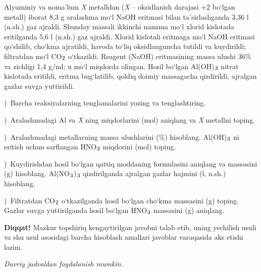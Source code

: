 \documentclass[11pt,a4paper]{article}
\renewcommand{\textsubscript}[1]{\ensuremath{_{\text{\fontsize{8}{8}\selectfont #1}}}}
\newcommand{\qsep}{\par\vspace{13pt}}
\newcommand{\diqqat}[1]{\par\smallskip\noindent\textbf{Diqqat!} #1\par\medskip}
\newcommand{\hdrpill}[1]{\begin{tikzpicture}[baseline=0pt]\node[fill=ygreen,text=white,rounded corners=8pt,inner xsep=10pt,inner ysep=5pt,font=\fontsize{13}{15}\bfseries\selectfont] at (0,0.475){#1};\end{tikzpicture}}
\newcommand{\curvar}{}\fancyhead[R]{\hdrpill{\curvar}}
\begin{document}
Alyuminiy va noma'lum \textit{X} metalldan (\textit{X} -- oksidlanish darajasi +2 bo`lgan metall) iborat 8,3 g aralashma mo`l NaOH eritmasi bilan ta'sirlashganda 3,36 l (n.sh.) gaz ajraldi. Shunday massali ikkinchi namuna mo`l xlorid kislotada eritilganda 5,6 l (n.sh.) gaz ajraldi. Xlorid kislotali eritmaga mo`l NaOH eritmasi qo`shilib, cho`kma ajratildi, havoda to`liq oksidlanguncha tutildi va kuydirildi; filtratdan mo`l CO\textsubscript{2} o`tkazildi. Reagent (NaOH) eritmasining massa ulushi 36\% va zichligi 1,4 g/ml; u mo`l miqdorda olingan. Hosil bo`lgan Al(OH)\textsubscript{3} nitrat kislotada eritildi, eritma bug`latilib, qoldiq doimiy massagacha qizdirildi, ajralgan gazlar suvga yuttirildi.\par
{})\ Barcha reaksiyalarning tenglamalarini yozing va tenglashtiring.\par
{})\ Aralashmadagi Al va \textit{X} ning miqdorlarini (mol) aniqlang va \textit{X} metallni toping.\par
{})\ Aralashmadagi metallarning massa ulushlarini (\%) hisoblang. Al(OH)\textsubscript{3} ni eritish uchun sarflangan HNO\textsubscript{3} miqdorini (mol) toping.\par
{})\ Kuydirishdan hosil bo`lgan qattiq moddaning formulasini aniqlang va massasini (g) hisoblang. Al(NO\textsubscript{3})\textsubscript{3} qizdirilganda ajralgan gazlar hajmini (l, n.sh.) hisoblang.\par
{})\ Filtratdan CO\textsubscript{2} o`tkazilganda hosil bo`lgan cho`kma massasini (g) toping. Gazlar suvga yuttirilganda hosil bo`lgan HNO\textsubscript{3} massasini (g) aniqlang.\par
\diqqat{Mazkur topshiriq kengaytirilgan javobni talab etib, uning yechilish usuli va shu usul asosidagi barcha hisoblash amallari javoblar varaqasida aks etishi lozim.}\qsep
\newpage
\renewcommand{\curvar}{13-variant}
\thispagestyle{first}
\noindent\textit{Davriy jadvaldan foydalanish mumkin.}
\par\smallskip
\end{document}
